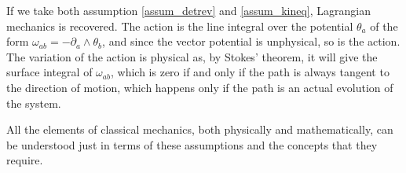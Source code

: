 If we take both assumption \ref{assum_detrev} and \ref{assum_kineq}, Lagrangian mechanics is recovered. The action is the line integral over the potential $\theta_a$ of the form $\omega_{ab} = - \partial_a \wedge \theta_b$, and since the vector potential is unphysical, so is the action. The variation of the action is physical as, by Stokes' theorem, it will give the surface integral of $\omega_{ab}$, which is zero if and only if the path is always tangent to the direction of motion, which happens only if the path is an actual evolution of the system.

All the elements of classical mechanics, both physically and mathematically, can be understood just in terms of these assumptions and the concepts that they require.

